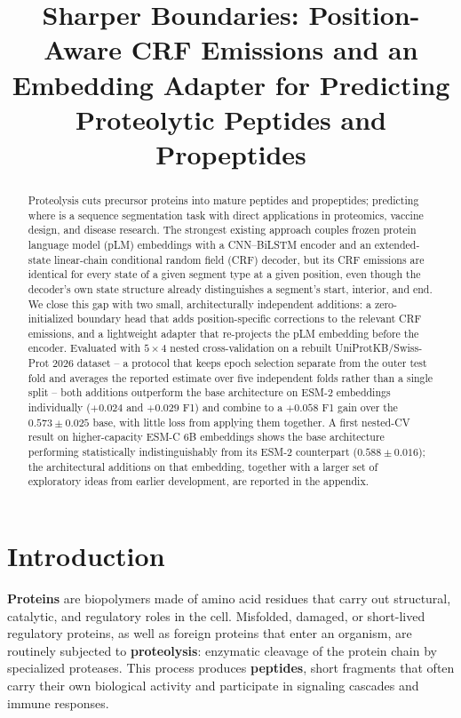 \documentclass{article}
\begin{document}
\title{Sharper Boundaries: Position-Aware CRF Emissions and an Embedding
Adapter for Predicting Proteolytic Peptides and Propeptides}

\maketitle

\begin{abstract}
Proteolysis cuts precursor proteins into mature peptides and propeptides; predicting where is a sequence segmentation task with direct applications in proteomics, vaccine design, and disease research. The strongest existing approach couples frozen protein language model (pLM) embeddings with a CNN--BiLSTM encoder and an extended-state linear-chain conditional random field (CRF) decoder, but its CRF emissions are identical for every state of a given segment type at a given position, even though the decoder's own state structure already distinguishes a segment's start, interior, and end. We close this gap with two small, architecturally independent additions: a zero-initialized boundary head that adds position-specific corrections to the relevant CRF emissions, and a lightweight adapter that re-projects the pLM embedding before the encoder. Evaluated with $5\times4$ nested cross-validation on a rebuilt UniProtKB/Swiss-Prot 2026 dataset -- a protocol that keeps epoch selection separate from the outer test fold and averages the reported estimate over five independent folds rather than a single split -- both additions outperform the base architecture on ESM-2 embeddings individually ($+0.024$ and $+0.029$ F1) and combine to a $+0.058$ F1 gain over the $0.573\pm0.025$ base, with little loss from applying them together. A first nested-CV result on higher-capacity ESM-C 6B embeddings shows the base architecture performing statistically indistinguishably from its ESM-2 counterpart ($0.588\pm0.016$); the architectural additions on that embedding, together with a larger set of exploratory ideas from earlier development, are reported in the appendix.
\end{abstract}

\section{Introduction}
\label{sec:intro}

\textbf{Proteins} are biopolymers made of amino acid residues that carry out structural, catalytic, and regulatory roles in the cell. Misfolded, damaged, or short-lived regulatory proteins, as well as foreign proteins that enter an organism, are routinely subjected to \textbf{proteolysis}: enzymatic cleavage of the protein chain by specialized proteases. This process produces \textbf{peptides}, short fragments that often carry their own biological activity and participate in signaling cascades and immune responses.
\end{document}
